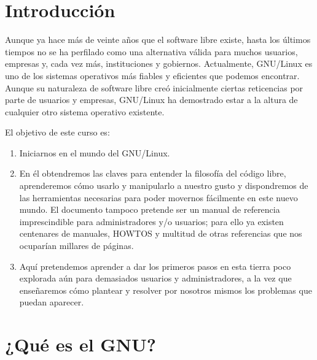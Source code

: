 \documentclass[12pt]{article}
\begin{document}
\newpage
\listoftables

\newpage
\section{Introducción}

Aunque ya hace más de veinte años que el software libre existe, hasta los últimos tiempos no se ha perfilado como una alternativa válida para muchos usuarios, empresas y, cada vez más, instituciones y gobiernos. Actualmente, GNU/Linux es uno de los sistemas operativos más fiables y eficientes que podemos encontrar. Aunque su naturaleza de software libre creó inicialmente ciertas reticencias por parte de usuarios y empresas, GNU/Linux ha demostrado estar a la altura de cualquier otro sistema operativo existente.

El objetivo de este curso es:

\begin{enumerate}
  \item Iniciarnos en el mundo del GNU/Linux.
  \item En él obtendremos las claves para entender la filosofía del código libre, aprenderemos cómo usarlo y manipularlo a nuestro gusto y dispondremos de las herramientas necesarias para poder movernos fácilmente en este nuevo mundo. El documento tampoco pretende ser un manual de referencia imprescindible para administradores y/o usuarios; para ello ya existen centenares de manuales, HOWTOS y multitud de otras referencias que nos ocuparían millares de páginas. 
  \item Aquí pretendemos aprender a dar los primeros pasos en esta tierra poco explorada aún para demasiados usuarios y administradores, a la vez que enseñaremos cómo plantear y resolver por nosotros mismos los problemas que puedan aparecer.
\end{enumerate}

\section{¿Qué es el GNU?}
\end{document}
